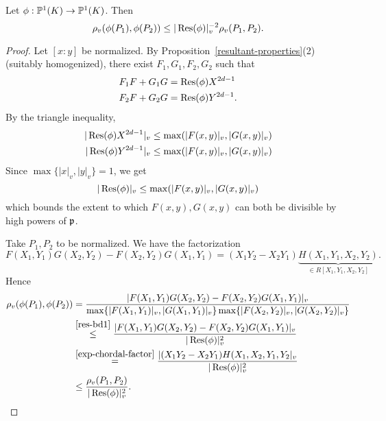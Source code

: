 \begin{thm}\label{bd-exp-chordal}
Let $\phi:\mathbb{P}^1(K)\to \mathbb{P}^1(K)$. Then
\[
\rho_v(\phi(P_1),\phi(P_2))\le |\operatorname{Res}(\phi)|_v^{-2}\rho_v(P_1,P_2).
\] 
\end{thm}
\begin{proof}
Let $[x:y]$ be normalized. 
By Proposition~\ref{resultant-properties}(2) (suitably homogenized), there exist $F_1, G_1,F_2,G_2$ such that 
\begin{align*}
F_1F+G_1G&=\operatorname{Res}(\phi)X^{2d-1}\\
F_2F+G_2G&=\operatorname{Res}(\phi)Y^{2d-1}.
\end{align*}
By the triangle inequality,
\begin{align*}
|\operatorname{Res}(\phi)X^{2d-1}|_v&\le \max(|F(x,y)|_v,|G(x,y)|_v)\\
|\operatorname{Res}(\phi)Y^{2d-1}|_v&\le \max(|F(x,y)|_v,|G(x,y)|_v)
\end{align*}
Since $\max\{|x|_v,|y|_v\}=1$, we get
\begin{equation}\label{res-bd1}
|\operatorname{Res}(\phi)|_v \le \max(|F(x,y)|_v,|G(x,y)|_v)
\end{equation}
which bounds the extent to which $F(x,y), G(x,y)$ can both be divisible by high powers of $\mathfrak{p}$.

Take $P_1,P_2$ to be normalized. We have the factorization
\begin{equation}\label{exp-chordal-factor}
F(X_1,Y_1)G(X_2,Y_2)-F(X_2,Y_2)G(X_1,Y_1)=(X_1Y_2-X_2Y_1)\underbrace{H(X_1,Y_1,X_2,Y_2)}_{\in R[X_1,Y_1,X_2,Y_2]}.
\end{equation}
Hence
\begin{align*}
\rho_v(\phi(P_1),\phi(P_2))&=\frac{|F(X_1,Y_1)G(X_2,Y_2)-F(X_2,Y_2)G(X_1,Y_1)|_v}{\max\{|F(X_1,Y_1)|_v,|G(X_1,Y_1)|_v\}\max\{|F(X_2,Y_2)|_v,|G(X_2,Y_2)|_v\} }\\
&\stackrel{\eqref{res-bd1}}{\le}
\frac{|F(X_1,Y_1)G(X_2,Y_2)-F(X_2,Y_2)G(X_1,Y_1)|_v}{|\operatorname{Res}(\phi)|_v^2}\\
&\stackrel{\eqref{exp-chordal-factor}}=\frac{|(X_1Y_2-X_2Y_1)H(X_1,X_2,Y_1,Y_2|_v}{|\operatorname{Res}(\phi)|_v^2}\\
&\le \frac{\rho_v(P_1,P_2)}{|\operatorname{Res}(\phi)|_v^2}.
\end{align*}
\end{proof}
